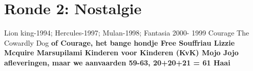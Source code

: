 
\section{Ronde 2: Nostalgie}
\begin{questions}

\vspace{5mm}
\question[2] Lion king-1994; Hercules-1997; Mulan-1998; Fantasia 2000- 1999
\vspace{5mm}
\question[2] Courage The Cowardly Dog \bf{of} Courage, het bange hondje
\vspace{5mm}
\question[2] Free Souffriau
\vspace{5mm}
\question[2] Lizzie Mcquire
\vspace{5mm}
\question[2] Marsupilami
\vspace{5mm}
\question[2] Kinderen voor Kinderen (KvK)
\vspace{5mm}
\question[2] Mojo Jojo
\vspace{5mm}
 afleveringen, \bf{maar we aanvaarden 59-63}, 20+20+21 = 61
\vspace{5mm}
\question[2] Haai

\end{questions}
\newpage
